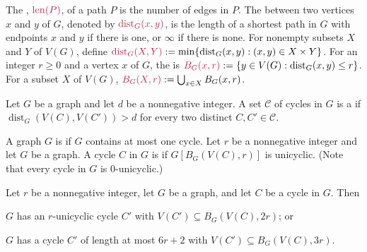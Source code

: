 \documentclass{patmorin}
\newcommand{\pat}[1]{\textcolor{Blue}{[Pat: #1]}}
\newcommand{\gwen}[1]{\textcolor{Purple}{Gwen: #1}}
\newcommand{\piotr}[1]{\textcolor{red}{Piotr: #1}}
\DeclareMathOperator{\len}{len}
\DeclareMathOperator{\dist}{dist}
\begin{document}
The , $\mathdefin{\len(P)}$, of a path $P$
is the number of edges in $P$.
The  between two vertices $x$ and $y$ of $G$,
denoted by $\mathdefin{\dist_G(x,y)}$,
is the length of a shortest path in $G$ with endpoints $x$ and $y$ if there is one, or $\infty$ if there is none.
For nonempty subsets $X$ and $Y$ of $V(G)$,
define $\mathdefin{\dist_G(X,Y)}:=\min\{\dist_G(x,y):(x,y)\in X\times Y\}$.
For an integer $r\ge 0$ and a vertex $x$ of $G$,
the  is $\mathdefin{B_G(x,r)}:=\{y\in V(G):\dist_G(x,y)\le r\}$.  For a subset $X$ of $V(G)$, $\mathdefin{B_G(X,r)}:=\bigcup_{x\in X}B_G(x,r)$.

Let $G$ be a graph and let $d$ be a nonnegative integer.
A set $\mathcal{C}$ of cycles in $G$ is a  if $\dist_G(V(C),V(C'))> d$ for every two distinct $C,C'\in\mathcal{C}$.


A graph $G$ is  if $G$ contains at most one cycle.  Let $r$ be a nonnegative integer and let $G$ be a graph.
A cycle $C$ in $G$ is 
if $G[B_G(V(C),r)]$ is unicyclic. (Note that every cycle in $G$ is $0$-unicyclic.)


\begin{lem}\label{short_or_unicycle_nearby}
  Let $r$ be a nonnegative integer, let $G$ be a graph, and let $C$ be a cycle in $G$.
  Then
  \begin{tightenum}%
    \item $G$ has an $r$-unicyclic cycle $C'$ with $V(C')\subseteq B_G(V(C),2r)$; or\label{short_or_unicycle_nearby:unicyclic}
    \item $G$ has a cycle $C'$ of length at most $6r+2$ with $V(C')\subseteq B_G(V(C),3r)$.\label{short_or_unicycle_nearby:short}
  \end{tightenum}
\end{lem}
\end{document}
